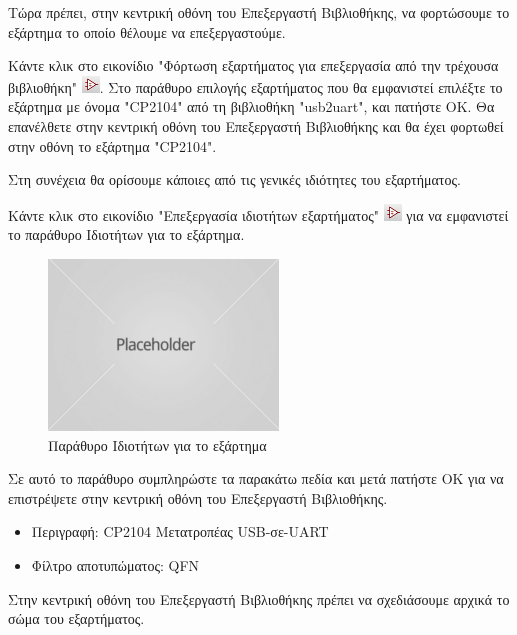 \documentclass[a4paper]{article}
\begin{document}
Τώρα πρέπει, στην κεντρική οθόνη του Επεξεργαστή Βιβλιοθήκης, να φορτώσουμε το εξάρτημα το οποίο θέλουμε να επεξεργαστούμε. 

Κάντε κλικ στο εικονίδιο "Φόρτωση εξαρτήματος για επεξεργασία από την τρέχουσα βιβλιοθήκη" \includegraphics{img/graphic.png}. Στο παράθυρο επιλογής εξαρτήματος που θα εμφανιστεί επιλέξτε το εξάρτημα με όνομα "CP2104" από τη βιβλιοθήκη "usb2uart", και πατήστε ΟΚ. Θα επανέλθετε στην κεντρική οθόνη του Επεξεργαστή Βιβλιοθήκης και θα έχει φορτωθεί στην οθόνη το εξάρτημα "CP2104".

Στη συνέχεια θα ορίσουμε κάποιες από τις γενικές ιδιότητες του εξαρτήματος. 

Κάντε κλικ στο εικονίδιο "Επεξεργασία ιδιοτήτων εξαρτήματος" \includegraphics{img/graphic.png} για να εμφανιστεί το παράθυρο Ιδιοτήτων για το εξάρτημα. 

\begin{figure}
  \begin{center}
    \includegraphics{img/kicad-main.png}
    \caption{Παράθυρο Ιδιοτήτων για το εξάρτημα}
    \label{fig:kicad-main}
  \end{center}
\end{figure}

Σε αυτό το παράθυρο συμπληρώστε τα παρακάτω πεδία και μετά πατήστε ΟΚ για να επιστρέψετε στην κεντρική οθόνη του Επεξεργαστή Βιβλιοθήκης.

\begin{itemize}
    \item Περιγραφή: CP2104 Μετατροπέας USB-σε-UART
    \item Φίλτρο αποτυπώματος: QFN
\end{itemize}

Στην κεντρική οθόνη του Επεξεργαστή Βιβλιοθήκης πρέπει να σχεδιάσουμε αρχικά το σώμα του εξαρτήματος. 
\end{document}
